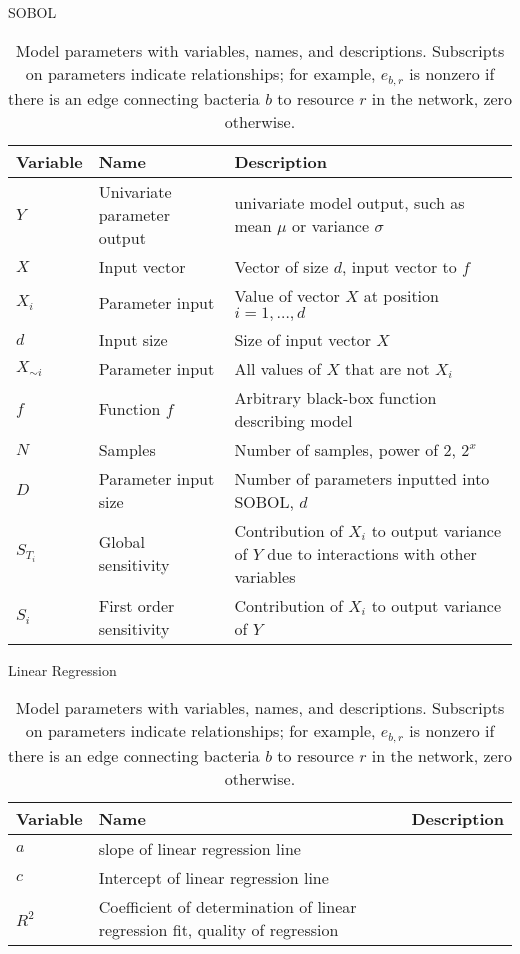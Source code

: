 \begin{table}[htbp]
    SOBOL
    \begin{tabularx}{\textwidth}{l l X}
        \toprule
        \textbf{Variable} & \textbf{Name} & \textbf{Description} \\
        \midrule
        $Y$ & Univariate parameter output & univariate model output, such as mean $\mu$ or variance $\sigma$ \\
        $X$ & Input vector & Vector of size $d$, input vector to $f$\\
        $X_i$ & Parameter input & Value of vector $X$ at position $i=1, \dots, d$ \\
        $d$ & Input size & Size of input vector $X$\\
        $X_{\sim i}$ & Parameter input & All values of $X$ that are not $X_i$ \\
        $f$ & Function $f$& Arbitrary black-box function describing model \\
        $N$ & Samples & Number of samples, power of 2, $2^x$ \\
        $D$ & Parameter input size & Number of parameters inputted into SOBOL, $d$ \\
        $S_{T_i}$ & Global sensitivity & Contribution of $X_i$ to output variance of $Y$ due to interactions with other variables  \\
        $S_i$ & First order sensitivity & Contribution of $X_i$ to output variance of $Y$ \\
        \bottomrule
    \end{tabularx} \newline

    Linear Regression
    \begin{tabularx}{\textwidth}{l l X}
        \toprule
        \textbf{Variable} & \textbf{Name} & \textbf{Description} \\
        \midrule
        $a$ & slope of linear regression line \\
        $c$ & Intercept of linear regression line\\
        $R^2$ & Coefficient of determination of linear regression fit, quality of regression \\
        \bottomrule
    \end{tabularx}
    \caption{Model parameters with variables, names, and descriptions. Subscripts on parameters indicate relationships; for example, $e_{b, r}$ is nonzero if there is an edge connecting bacteria $b$ to resource $r$ in the network, zero otherwise.}
    \label{tab:parameters}
\end{table}
